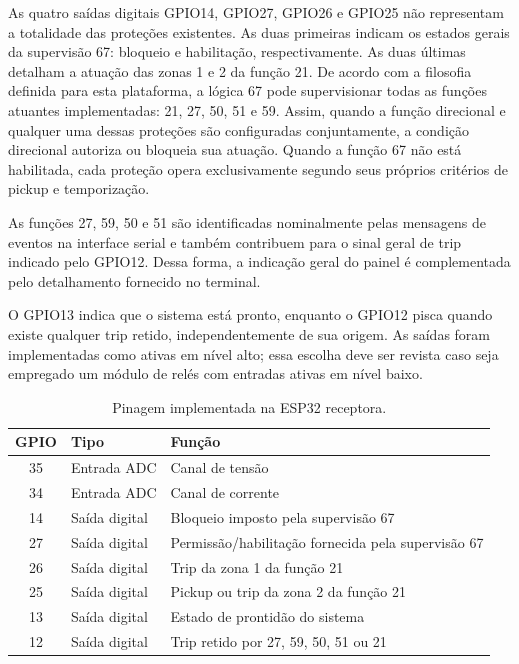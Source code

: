 As quatro saídas digitais GPIO14, GPIO27, GPIO26 e GPIO25 não representam a totalidade das proteções existentes. As duas primeiras indicam os estados gerais da supervisão 67: bloqueio e habilitação, respectivamente. As duas últimas detalham a atuação das zonas 1 e 2 da função 21. De acordo com a filosofia definida para esta plataforma, a lógica 67 pode supervisionar todas as funções atuantes implementadas: 21, 27, 50, 51 e 59. Assim, quando a função direcional e qualquer uma dessas proteções são configuradas conjuntamente, a condição direcional autoriza ou bloqueia sua atuação. Quando a função 67 não está habilitada, cada proteção opera exclusivamente segundo seus próprios critérios de pickup e temporização.

As funções 27, 59, 50 e 51 são identificadas nominalmente pelas mensagens de eventos na interface serial e também contribuem para o sinal geral de trip indicado pelo GPIO12. Dessa forma, a indicação geral do painel é complementada pelo detalhamento fornecido no terminal.

O GPIO13 indica que o sistema está pronto, enquanto o GPIO12 pisca quando existe qualquer trip retido, independentemente de sua origem. As saídas foram implementadas como ativas em nível alto; essa escolha deve ser revista caso seja empregado um módulo de relés com entradas ativas em nível baixo.

\begin{table}[H]
  \centering
  \small
  \caption{Pinagem implementada na ESP32 receptora.}
  \label{tab:pinagem-receptora}
  \begin{tabular}{cll}
    \toprule
    GPIO & Tipo & Função \\
    \midrule
    35 & Entrada ADC & Canal de tensão \\
    34 & Entrada ADC & Canal de corrente \\
    14 & Saída digital & Bloqueio imposto pela supervisão 67 \\
    27 & Saída digital & Permissão/habilitação fornecida pela supervisão 67 \\
    26 & Saída digital & Trip da zona 1 da função 21 \\
    25 & Saída digital & Pickup ou trip da zona 2 da função 21 \\
    13 & Saída digital & Estado de prontidão do sistema \\
    12 & Saída digital & Trip retido por 27, 59, 50, 51 ou 21 \\
    \bottomrule
  \end{tabular}
\end{table}

